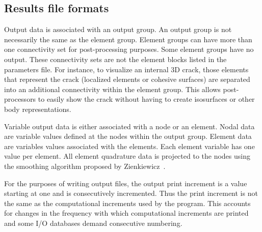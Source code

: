 \subsection{Results file formats}
\label{sect.file.results}
Output data is associated with an output group.  An output group is not
necessarily the same as the element group.  Element groups can have more
than one connectivity set for post-processing purposes.  Some element
groups have no output.  These connectivity sets are not the element blocks
listed in the parameters file.  For instance, to visualize an internal 3D
crack, those elements that represent the crack (localized elements or
cohesive surfaces) are separated into an additional connectivity within the
element group.  This allows post-processors to easily show the crack
without having to create isosurfaces or other body representations.

Variable output data is either associated with a node or an element.  Nodal
data are variable values defined at the nodes within the output group. 
Element data are variables values associated with the elements.  Each
element variable has one value per element.  All element quadrature data is
projected to the nodes using the smoothing algorithm proposed by 
Zienkiewicz~\cite{Zienkiewicz}.

For the purposes of writing output files, the output print increment is a
value starting at one and is consecutively incremented.  Thus the print
increment is not the same as the computational increments used by the
program.  This accounts for changes in the frequency with which
computational increments are printed and some I/O databases demand
consecutive numbering.


